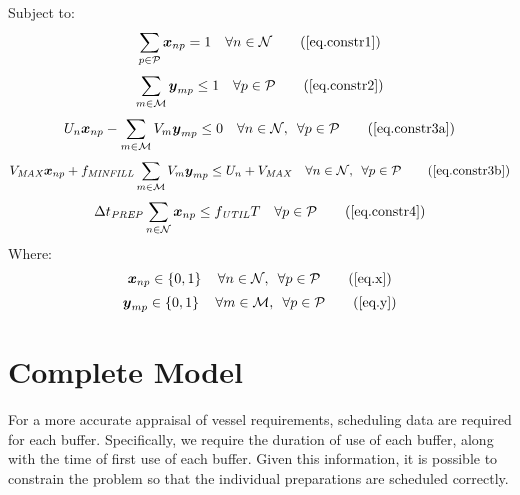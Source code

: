 Subject to:
\begin{equation}
    \sum_{p \in \mathcal{P}} \boldsymbol{x}_{np} = 1 \quad \forall n \in
    \mathcal{N}
    \tag{\ref{eq.constr1}}
\end{equation}
\begin{equation}
    \sum_{m \in \mathcal{M}} \boldsymbol{y}_{mp} \le 1 \quad \forall p \in 
    \mathcal{P}
    \tag{\ref{eq.constr2}}
\end{equation}
\begin{equation}
    U_{n} \boldsymbol{x}_{np} - \sum_{m \in \mathcal{M}} V_{m} 
    \boldsymbol{y}_{mp} \le 0
    \quad \forall n \in \mathcal{N}, \enspace \forall p \in \mathcal{P}
    \tag{\ref{eq.constr3a}}
\end{equation}
\begin{equation}
    V_{\mathit{MAX}} \boldsymbol{x}_{np} + f_{\mathit{MINFILL}} 
    \sum_{m \in \mathcal{M}} V_{m} \boldsymbol{y}_{mp} \le U_{n}
    + V_{\mathit{MAX}} \quad \forall n \in \mathcal{N}, \enspace \forall p \in
    \mathcal{P}
    \tag{\ref{eq.constr3b}}
\end{equation}
\begin{equation}
    \Delta t_{\mathit{PREP}} \sum_{n \in \mathcal{N}} \boldsymbol{x}_{np} \le
    f_{\mathit{UTIL}} T \quad \forall p \in \mathcal{P}
    \tag{\ref{eq.constr4}}
\end{equation}
Where:
\begin{equation}
    \boldsymbol{x}_{np} \in \left\{ 0, 1 \right\} \quad \forall n \in 
    \mathcal{N}, \enspace \forall p \in \mathcal{P}
    \tag{\ref{eq.x}}
\end{equation}
\begin{equation}
    \boldsymbol{y}_{mp} \in \left\{ 0, 1 \right\} \quad \forall m \in 
    \mathcal{M}, \enspace \forall p \in \mathcal{P}
    \tag{\ref{eq.y}}
\end{equation}

\section{Complete Model}\label{S.completemodel}

For a more accurate appraisal of vessel requirements, scheduling data are
required for each buffer.
Specifically, we require the duration of use of each buffer, along with the
time of first use of each buffer.
Given this information, it is possible to constrain the problem so that the
individual preparations are scheduled correctly.

